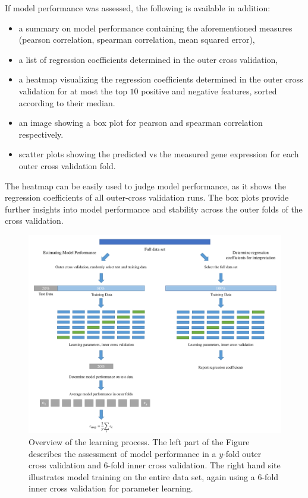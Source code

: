 \documentclass{article}
\begin{document}
If model performance was assessed, the following is available in addition:
\begin{itemize}
\item a summary on model performance containing the aforementioned measures (pearson correlation, spearman correlation, mean squared error),
\item a list of regression coefficients determined in the outer cross validation,
\item a heatmap visualizing the regression coefficients determined in the outer cross validation for at most the top $10$ positive and negative features, sorted according to their median.
\item an image showing a box plot for pearson and spearman correlation respectively.
\item scatter plots showing the predicted vs the measured gene expression for each outer cross validation fold.
\end{itemize}
The heatmap can be easily used to judge model performance, as it shows the regression coefficients of all outer-cross validation runs. The box plots provide further insights into model performance and stability across the outer folds of the cross validation.
\vspace{1cm}
\begin{figure}[h!]
\begin{center}
\includegraphics[width=\textwidth]{Learning.pdf}
\end{center}
\caption{Overview of the learning process. 
The left part of the Figure describes the assessment of model performance in a $y$-fold outer cross validation and $6$-fold inner cross validation. 
The right hand site illustrates model training on the entire data set, again using a $6$-fold inner cross validation for parameter learning.}
\label{learningFig}
\end{figure}
\end{document}
